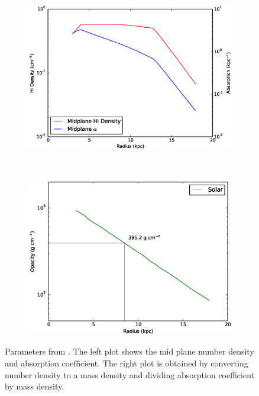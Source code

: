 \begin{figure}
        \centering
        \begin{subfigure}[b]{0.45\textwidth}
                \includegraphics[width=\textwidth]{graphics/densityabsorptionvr.eps}
        \end{subfigure}
        ~ 
        \begin{subfigure}[b]{0.45\textwidth}
                \includegraphics[width=\textwidth]{graphics/opacityvr.eps}
        \end{subfigure}
        \caption[Parameters from \citet{wolfireEt03}.]{Parameters from \citet{wolfireEt03}. The left plot shows the mid plane number density and absorption coefficient. The right plot is obtained by converting number density to a mass density and dividing absorption coefficient by mass density.}
        \label{fig:wolfiresummary}
\end{figure}

